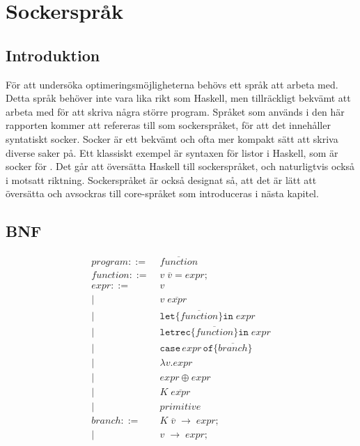 \documentclass[Rapport]{subfiles}
\begin{document}
\section{Sockerspråk}

%
%
%
%
%
%
%

%

\subsection{Introduktion}

För att undersöka optimeringsmöjligheterna behövs ett språk att arbeta med. 
Detta språk behöver inte vara lika rikt som Haskell, men tillräckligt bekvämt
att arbeta med för att skriva några större program. Språket som används i den
här rapporten kommer att refereras till som sockerspråket, för att det 
innehåller syntatiskt socker. Socker är ett bekvämt och ofta mer kompakt sätt 
att skriva diverse saker på. Ett klassiskt exempel är syntaxen
för listor i Haskell, \miniCode{[5,0,4]} som är socker för .
    Det går att översätta Haskell till sockerspråket, och naturligtvis också
i motsatt riktning. Sockerspråket är också designat så, att det är lätt att
översätta och avsockras till core-språket som introduceras i nästa kapitel. 

\subsection{BNF}

\begin{equation*}
\begin{aligned}
program ::=&\; \overline{function} \\
function ::=&\; v \; \overline{v} \mathtt{=} expr \mathtt{;} \\
expr ::=&\;  v \\
       |&\; v \; \overline{expr}  \\
       |&\; \mathtt{let \{} \overline{function} \mathtt{\} in }\; expr \\
       |&\; \mathtt{letrec \{} \overline{function} \mathtt{\} in} \; expr \\
       |&\; \mathtt{case}\,expr\,\mathtt{of \{} \overline{branch} \mathtt{\}} \\
       |&\; \mathtt{\lambda } v \mathtt{.} expr \\
       |&\; expr \oplus expr \\
       |&\; K \; \overline{expr} \\
       |&\; primitive \\
branch ::=&\; K \; \overline{v} \; \mathtt{\rightarrow} \; expr \mathtt{;} \\
         |&\; v \; \mathtt{\rightarrow} \; expr \mathtt{;}
\end{aligned}
\end{equation*}
\end{document}
